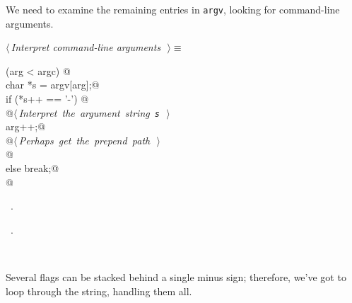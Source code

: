\documentclass{report}
\begin{document}
We need to examine the remaining entries in \verb|argv|, looking for
command-line arguments.
\begin{flushleft} \small
\begin{minipage}{\linewidth} \label{scrap23}
$\langle\,${\it Interpret command-line arguments}\nobreak\ {\footnotesize {}}$\,\rangle\equiv$
\vspace{-1ex}
\begin{list}{}{} \item
\mbox{}\verb@while (arg < argc) {@\\
\mbox{}\verb@  char *s = argv[arg];@\\
\mbox{}\verb@  if (*s++ == '-') {@\\
\mbox{}\verb@    @\hbox{$\langle\,${\it Interpret the argument string \verb|s|}\nobreak\ {\footnotesize {}}$\,\rangle$}\verb@@\\
\mbox{}\verb@    arg++;@\\
\mbox{}\verb@    @\hbox{$\langle\,${\it Perhaps get the prepend path}\nobreak\ {\footnotesize {}}$\,\rangle$}\verb@@\\
\mbox{}\verb@  }@\\
\mbox{}\verb@  else break;@\\
\mbox{}\verb@}@{\NWsep}
\end{list}
\vspace{-1ex}
\footnotesize\addtolength{\baselineskip}{-1ex}
\begin{list}{}{\setlength{\itemsep}{-\parsep}\setlength{\itemindent}{-\leftmargin}}
\item \NWtxtMacroDefBy\ .
\item \NWtxtMacroRefIn\ .
\end{list}
\end{minipage}\\[4ex]
\end{flushleft}
Several flags can be stacked behind a single minus sign; therefore,
we've got to loop through the string, handling them all.
\end{document}
